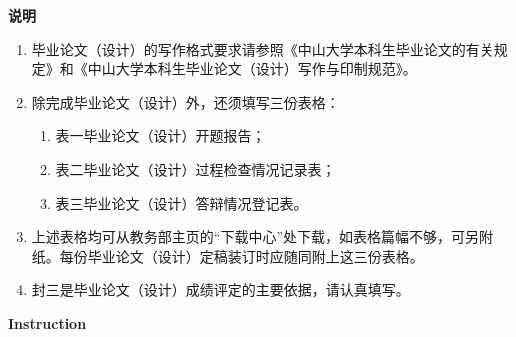 
\begin{center}
  {\heiti\bfseries 说\hspace{2\ccwd}明}
\end{center}

\fontsize{15}{20}\selectfont

\songti
\begin{enumerate}[label=\arabic*.,leftmargin=*]
  \item 毕业论文（设计）的写作格式要求请参照《中山大学本科生毕业论文的有关规定》和《中山大学本科生毕业论文（设计）写作与印制规范》。
  \item 除完成毕业论文（设计）外，还须填写三份表格：
  \begin{enumerate}[align=left,leftmargin=!,labelsep=0mm,label=（\arabic*）]
    \item 表一\hspace{\ccwd}毕业论文（设计）开题报告；
    \item 表二\hspace{\ccwd}毕业论文（设计）过程检查情况记录表；
    \item 表三\hspace{\ccwd}毕业论文（设计）答辩情况登记表。
  \end{enumerate}
  \item 上述表格均可从教务部主页的“下载中心”处下载，如表格篇幅不够，可另附纸。每份毕业论文（设计）定稿装订时应随同附上这三份表格。
  \item 封三是毕业论文（设计）成绩评定的主要依据，请认真填写。
\end{enumerate}
\vspace{1\baselineskip}

\begin{center}
  {\bfseries Instruction}
\end{center}


